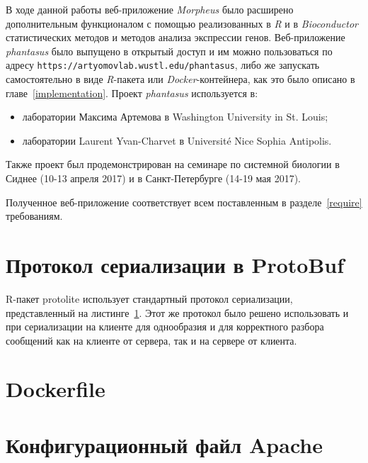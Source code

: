 \documentclass[annotation,specification]{itmo-student-thesis}
\begin{document}

\startconclusionpage
В ходе данной работы веб-приложение \emph{Morpheus} было расширено дополнительным функционалом с помощью реализованных в \emph{R} и в \emph{Bioconductor} статистических методов и методов анализа экспрессии генов. Веб-приложение \emph{phantasus} было выпущено в открытый доступ и им можно пользоваться по адресу \texttt{https://artyomovlab.wustl.edu/phantasus}, либо же запускать самостоятельно в виде \emph{R}-пакета или \emph{Docker}-контейнера, как это было описано в главе~\ref{implementation}.
Проект \emph{phantasus} используется в:\begin{itemize}
\item лаборатории Максима Артемова в Washington University in St. Louis;
\item лаборатории Laurent Yvan-Charvet в Universit\'e Nice Sophia Antipolis.
\end{itemize}

Также проект был продемонстрирован на семинаре по системной биологии в Сиднее (10-13 апреля 2017) и в Санкт-Петербурге (14-19 мая 2017).

Полученное веб-приложение соответствует всем поставленным в разделе~\ref{require} требованиям. 
\printmainbibliography

\appendix
\chapter{Протокол сериализации в ProtoBuf}\label{proto}
R-пакет protolite использует стандартный протокол сериализации, представленный на листинге~\ref{proto}. Этот же протокол было решено использовать и при сериализации на клиенте для однообразия и для корректного разбора сообщений как на клиенте от сервера, так и на сервере от клиента.

\chapter{Dockerfile}\label{dockerfile}


\chapter{Конфигурационный файл Apache}\label{apacheconf}

\end{document}
